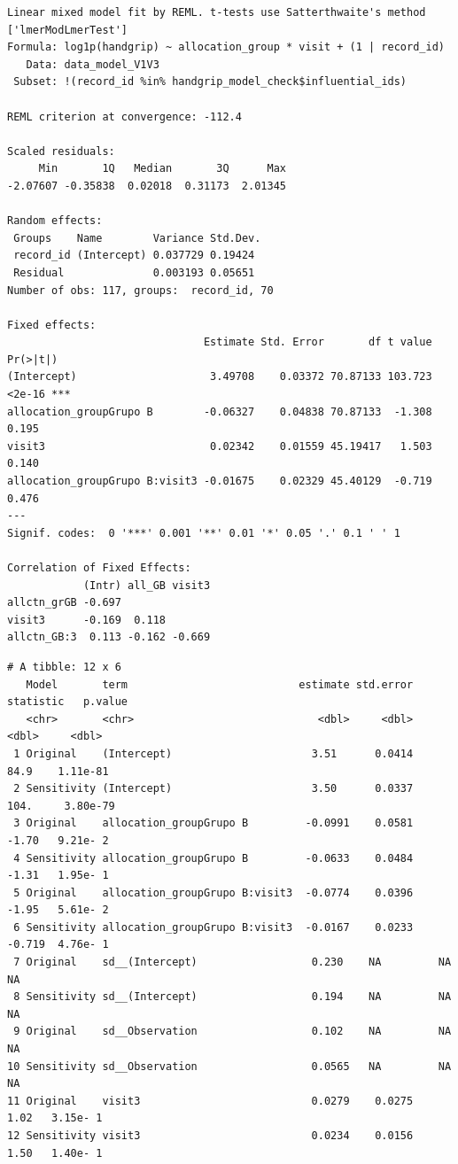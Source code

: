 \documentclass[
  12pt,
]{article}
\newenvironment{Shaded}{\begin{snugshade}}{\end{snugshade}}
\newcommand{\NormalTok}[1]{\textcolor[rgb]{0.00,0.23,0.31}{#1}}
\newcommand{\SpecialCharTok}[1]{\textcolor[rgb]{0.37,0.37,0.37}{#1}}
\begin{document}
\begin{verbatim}
Linear mixed model fit by REML. t-tests use Satterthwaite's method ['lmerModLmerTest']
Formula: log1p(handgrip) ~ allocation_group * visit + (1 | record_id)
   Data: data_model_V1V3
 Subset: !(record_id %in% handgrip_model_check$influential_ids)

REML criterion at convergence: -112.4

Scaled residuals: 
     Min       1Q   Median       3Q      Max 
-2.07607 -0.35838  0.02018  0.31173  2.01345 

Random effects:
 Groups    Name        Variance Std.Dev.
 record_id (Intercept) 0.037729 0.19424 
 Residual              0.003193 0.05651 
Number of obs: 117, groups:  record_id, 70

Fixed effects:
                               Estimate Std. Error       df t value Pr(>|t|)    
(Intercept)                     3.49708    0.03372 70.87133 103.723   <2e-16 ***
allocation_groupGrupo B        -0.06327    0.04838 70.87133  -1.308    0.195    
visit3                          0.02342    0.01559 45.19417   1.503    0.140    
allocation_groupGrupo B:visit3 -0.01675    0.02329 45.40129  -0.719    0.476    
---
Signif. codes:  0 '***' 0.001 '**' 0.01 '*' 0.05 '.' 0.1 ' ' 1

Correlation of Fixed Effects:
            (Intr) all_GB visit3
allctn_grGB -0.697              
visit3      -0.169  0.118       
allctn_GB:3  0.113 -0.162 -0.669
\end{verbatim}

\begin{Shaded}
\end{Shaded}

\begin{verbatim}
# A tibble: 12 x 6
   Model       term                           estimate std.error statistic   p.value
   <chr>       <chr>                             <dbl>     <dbl>     <dbl>     <dbl>
 1 Original    (Intercept)                      3.51      0.0414    84.9    1.11e-81
 2 Sensitivity (Intercept)                      3.50      0.0337   104.     3.80e-79
 3 Original    allocation_groupGrupo B         -0.0991    0.0581    -1.70   9.21e- 2
 4 Sensitivity allocation_groupGrupo B         -0.0633    0.0484    -1.31   1.95e- 1
 5 Original    allocation_groupGrupo B:visit3  -0.0774    0.0396    -1.95   5.61e- 2
 6 Sensitivity allocation_groupGrupo B:visit3  -0.0167    0.0233    -0.719  4.76e- 1
 7 Original    sd__(Intercept)                  0.230    NA         NA     NA       
 8 Sensitivity sd__(Intercept)                  0.194    NA         NA     NA       
 9 Original    sd__Observation                  0.102    NA         NA     NA       
10 Sensitivity sd__Observation                  0.0565   NA         NA     NA       
11 Original    visit3                           0.0279    0.0275     1.02   3.15e- 1
12 Sensitivity visit3                           0.0234    0.0156     1.50   1.40e- 1
\end{verbatim}
\end{document}
